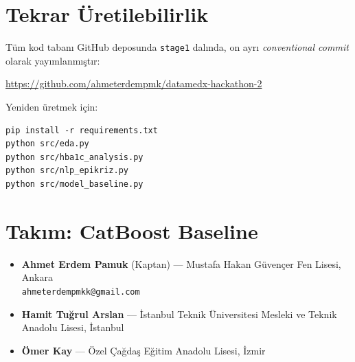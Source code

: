 \documentclass[11pt,a4paper]{article}
\begin{document}
\section{Tekrar Üretilebilirlik}

Tüm kod tabanı GitHub deposunda \texttt{stage1} dalında, on ayrı \emph{conventional commit} olarak yayımlanmıştır:
\begin{center}
\url{https://github.com/ahmeterdempmk/datamedx-hackathon-2}
\end{center}

Yeniden üretmek için:
\begin{verbatim}
pip install -r requirements.txt
python src/eda.py
python src/hba1c_analysis.py
python src/nlp_epikriz.py
python src/model_baseline.py
\end{verbatim}

\section*{Takım: CatBoost Baseline}

\begin{itemize}[leftmargin=1.5em,itemsep=1pt]
    \item \textbf{Ahmet Erdem Pamuk} (Kaptan) --- Mustafa Hakan Güvençer Fen Lisesi, Ankara \\ \texttt{ahmeterdempmkk@gmail.com}
    \item \textbf{Hamit Tuğrul Arslan} --- İstanbul Teknik Üniversitesi Mesleki ve Teknik Anadolu Lisesi, İstanbul
    \item \textbf{Ömer Kay} --- Özel Çağdaş Eğitim Anadolu Lisesi, İzmir
\end{itemize}
\end{document}
